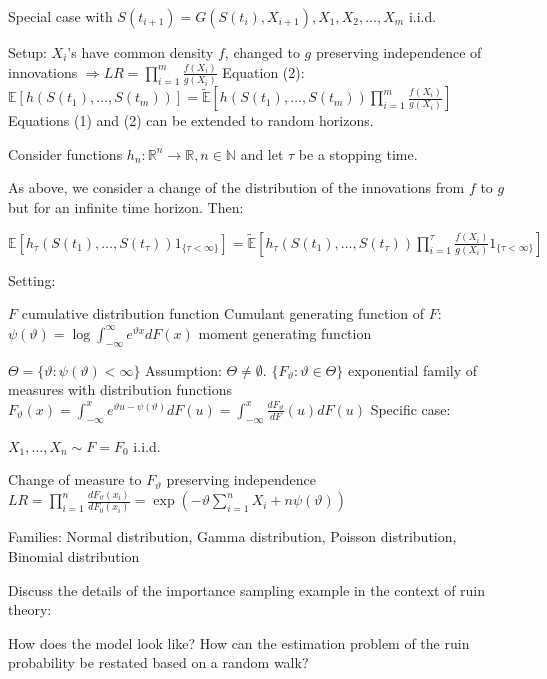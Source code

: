 Special case with \( S(t_{i+1}) = G(S(t_i), X_{i+1}), X_1, X_2, \dots, X_m \) i.i.d.

Setup: \( X_i \)'s have common density \( f \), changed to \( g \) preserving independence of innovations
\( \Rightarrow LR = \prod_{i=1}^m \frac{f(X_i)}{g(X_i)} \)
Equation (2):
\( \mathbb{E}[h(S(t_1), \dots, S(t_m))] = \widetilde{\mathbb{E}} \left[ h(S(t_1), \dots, S(t_m)) \prod_{i=1}^m \frac{f(X_i)}{g(X_i)} \right] \)
Equations (1) and (2) can be extended to random horizons.

Consider functions \( h_n: \mathbb{R}^n \rightarrow \mathbb{R}, n \in \mathbb{N} \)
and let \( \tau \) be a stopping time.

As above, we consider a change of the distribution of the innovations from \( f \) to \( g \) but for an 
infinite time horizon. Then:

\( \mathbb{E}[h_\tau(S(t_1), \dots, S(t_\tau)) 1_{\{\tau < \infty\}}] = \widetilde{\mathbb{E}} \left[ h_\tau(S(t_1), \dots,  S(t_\tau)) \prod_{i=1}^\tau \frac{f(X_i)}{g(X_i)} 1_{\{\tau < \infty\}} \right] \)


Setting: 

\( F \) cumulative distribution function
Cumulant generating function of \( F \): \( \psi(\vartheta) = \log \int_{-\infty}^\infty e^{\vartheta x} dF(x) \) moment generating function

\( \Theta = \{\vartheta: \psi(\vartheta) < \infty\} \) Assumption: \( \Theta \neq \emptyset \).
\( \{F_\vartheta: \vartheta \in \Theta\} \) exponential family of measures with distribution functions
\( F_\vartheta(x) = \int_{-\infty}^x e^{\vartheta u - \psi (\vartheta)} dF(u) = \int_{-\infty}^x \frac{dF_\vartheta}{dF}(u) dF(u) \)
Specific case:

\( X_1, \dots, X_n \sim F = F_0\) i.i.d.

Change of measure to \( F_\vartheta \) preserving independence \( LR = \prod_{i=1}^n \frac{dF_\vartheta(x_i)}{dF_0(x_i)} = \exp(-\vartheta \sum_{i=1}^n X_i + n \psi(\vartheta)) \) 

Families: Normal distribution, Gamma distribution, Poisson distribution, Binomial distribution


Discuss the details of the importance sampling example in the context of ruin
theory:

How does the model look like? How can the estimation problem of the ruin
probability be restated based on a random walk? 

